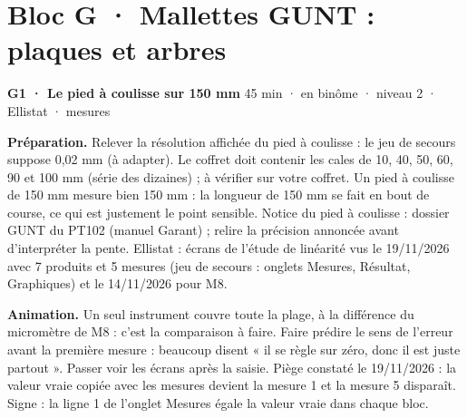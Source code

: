 \section*{Bloc G · Mallettes GUNT : plaques et arbres}
\begin{tcolorbox}[act]\textbf{G1 · Le pied à coulisse sur 150 mm} \hfill {\small 45 min · en binôme · niveau 2 · Ellistat · mesures}\end{tcolorbox}
\textbf{Préparation.} Relever la résolution affichée du pied à coulisse : le jeu de secours suppose 0,02 mm (à adapter). Le coffret doit contenir les cales de 10, 40, 50, 60, 90 et 100 mm (série des dizaines) ; à vérifier sur votre coffret. Un pied à coulisse de 150 mm mesure bien 150 mm : la longueur de 150 mm se fait en bout de course, ce qui est justement le point sensible. Notice du pied à coulisse : dossier GUNT du PT102 (manuel Garant) ; relire la précision annoncée avant d'interpréter la pente. Ellistat : écrans de l'étude de linéarité vus le 19/11/2026 avec 7 produits et 5 mesures (jeu de secours : onglets Mesures, Résultat, Graphiques) et le 14/11/2026 pour M8.\par
\textbf{Animation.} Un seul instrument couvre toute la plage, à la différence du micromètre de M8 : c'est la comparaison à faire. Faire prédire le sens de l'erreur avant la première mesure : beaucoup disent « il se règle sur zéro, donc il est juste partout ». Passer voir les écrans après la saisie. Piège constaté le 19/11/2026 : la valeur vraie copiée avec les mesures devient la mesure 1 et la mesure 5 disparaît. Signe : la ligne 1 de l'onglet Mesures égale la valeur vraie dans chaque bloc.\par
